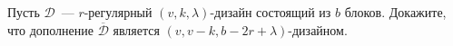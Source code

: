 Пусть $\mathcal{D}$~--- $r$-регулярный $(v, k, \lambda)$-дизайн состоящий из $b$ блоков. Докажите, что дополнение
$\overline{\mathcal{D}}$ является $(v, v - k, b - 2r + \lambda)$-дизайном.